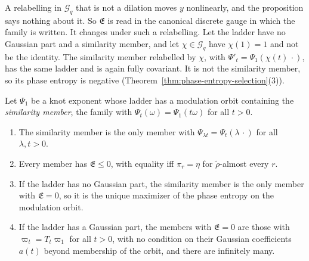 A relabelling in $\mathcal{G}_q$ that is not a dilation moves $y$ nonlinearly, and the proposition
says nothing about it. So $\mathfrak{E}$ is read in the canonical discrete gauge in which the
family is written. It changes under such a relabelling. Let the ladder have no Gaussian part and a
similarity member, and let $\chi \in \mathcal{G}_q$ have $\chi(1) = 1$ and not be the identity. The
similarity member relabelled by $\chi$, with $\Psi'_t = \Psi_1(\chi(t)\,\cdot)$, has the same ladder
and is again fully covariant. It is not the similarity member, so its phase entropy is negative
(Theorem~\ref{thm:phase-entropy-selection}(3)).

\begin{theorem}
\label{thm:phase-entropy-selection}

Let $\Psi_1$ be a knot exponent whose ladder has a modulation orbit containing the \emph{similarity member}, the family
with $\Psi_t(\omega) = \Psi_1(t\omega)$ for all $t > 0$.
\begin{enumerate}
\item The similarity member is the only member with $\Psi_{\lambda t} = \Psi_t(\lambda\,\cdot)$ for
all $\lambda, t > 0$.
\item Every member has $\mathfrak{E} \le 0$, with equality iff $\pi_r = \eta$ for
$\tilde\rho$-almost every $r$.
\item If the ladder has no Gaussian part, the similarity member is the only member with
$\mathfrak{E} = 0$, so it is the unique maximizer of the phase entropy on the modulation orbit.
\item If the ladder has a Gaussian part, the members with $\mathfrak{E} = 0$ are those with
$\varpi_t = T_t\varpi_1$ for all $t > 0$, with no condition on their Gaussian coefficients $a(t)$
beyond membership of the orbit, and there are infinitely many.
\end{enumerate}
\end{theorem}

